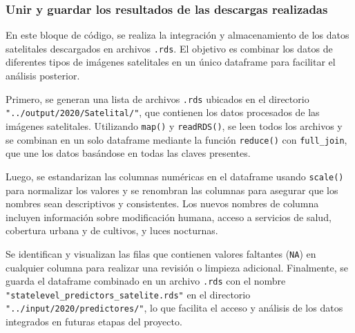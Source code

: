 \documentclass[
  12pt,
]{book}
\begin{document}
\hypertarget{unir-y-guardar-los-resultados-de-las-descargas-realizadas}{%
\subsubsection*{Unir y guardar los resultados de las descargas realizadas}\label{unir-y-guardar-los-resultados-de-las-descargas-realizadas}}

En este bloque de código, se realiza la integración y almacenamiento de los datos satelitales descargados en archivos \texttt{.rds}. El objetivo es combinar los datos de diferentes tipos de imágenes satelitales en un único dataframe para facilitar el análisis posterior.

Primero, se generan una lista de archivos \texttt{.rds} ubicados en el directorio
\texttt{"../output/2020/Satelital/"}, que contienen los datos procesados de las imágenes satelitales. Utilizando \texttt{map()} y \texttt{readRDS()}, se leen todos los archivos y se combinan en un solo dataframe mediante la función \texttt{reduce()} con \texttt{full\_join}, que une los datos basándose en todas las claves presentes.

Luego, se estandarizan las columnas numéricas en el dataframe usando \texttt{scale()} para normalizar los valores y se renombran las columnas para asegurar que los nombres sean descriptivos y consistentes. Los nuevos nombres de columna incluyen información sobre modificación humana, acceso a servicios de salud, cobertura urbana y de cultivos, y luces nocturnas.

Se identifican y visualizan las filas que contienen valores faltantes (\texttt{NA}) en cualquier columna para realizar una revisión o limpieza adicional. Finalmente, se guarda el dataframe combinado en un archivo \texttt{.rds} con el nombre \texttt{"statelevel\_predictors\_satelite.rds"} en el directorio
\texttt{"../input/2020/predictores/"}, lo que facilita el acceso y análisis de los datos integrados en futuras etapas del proyecto.
\end{document}
